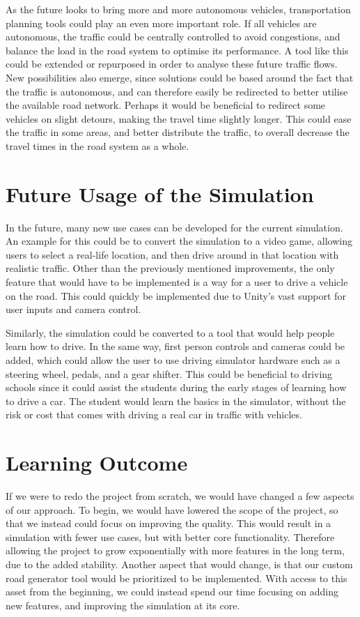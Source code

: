         As the future looks to bring more and more autonomous vehicles, transportation planning tools could play an even more important role. If all vehicles are autonomous, the traffic could be centrally controlled to avoid congestions, and balance the load in the road system to optimise its performance. A tool like this could be extended or repurposed in order to analyse these future traffic flows. New possibilities also emerge, since solutions could be based around the fact that the traffic is autonomous, and can therefore easily be redirected to better utilise the available road network. Perhaps it would be beneficial to redirect some vehicles on slight detours, making the travel time slightly longer. This could ease the traffic in some areas, and better distribute the traffic, to overall decrease the travel times in the road system as a whole.


    \section{Future Usage of the Simulation}
        In the future, many new use cases can be developed for the current simulation. An example for this could be to convert the simulation to a video game, allowing users to select a real-life location, and then drive around in that location with realistic traffic. Other than the previously mentioned improvements, the only feature that would have to be implemented is a way for a user to drive a vehicle on the road. This could quickly be implemented due to Unity's vast support for user inputs and camera control.

        Similarly, the simulation could be converted to a tool that would help people learn how to drive. In the same way, first person controls and cameras could be added, which could allow the user to use driving simulator hardware such as a steering wheel, pedals, and a gear shifter. This could be beneficial to driving schools since it could assist the students during the early stages of learning how to drive a car. The student would learn the basics in the simulator, without the risk or cost that comes with driving a real car in traffic with vehicles.
    
    \section{Learning Outcome}
        If we were to redo the project from scratch, we would have changed a few aspects of our approach. To begin, we would have lowered the scope of the project, so that we instead could focus on improving the quality. This would result in a simulation with fewer use cases, but with better core functionality. Therefore allowing the project to grow exponentially with more features in the long term, due to the added stability. Another aspect that would change, is that our custom road generator tool would be prioritized to be implemented. With access to this asset from the beginning, we could instead spend our time focusing on adding new features, and improving the simulation at its core.


